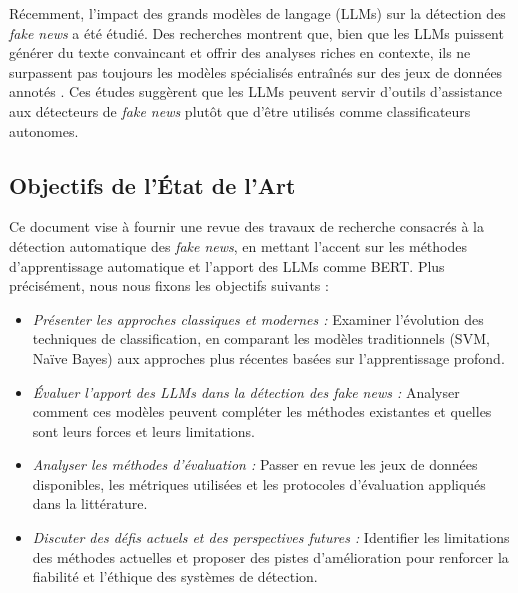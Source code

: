 \documentclass[a4paper,12pt, twocolumn]{article}
\begin{document}
\begin{twocolumn}
Récemment, l’impact des grands modèles de langage (LLMs) sur la détection des \textit{fake news} a été étudié. Des recherches montrent que, bien que les LLMs puissent générer du texte convaincant et offrir des analyses riches en contexte, ils ne surpassent pas toujours les modèles spécialisés entraînés sur des jeux de données annotés \cite{hu_bad_2024}. Ces études suggèrent que les LLMs peuvent servir d’outils d’assistance aux détecteurs de \textit{fake news} plutôt que d’être utilisés comme classificateurs autonomes.

\subsection{Objectifs de l’État de l’Art}
Ce document vise à fournir une revue des travaux de recherche consacrés à la détection automatique des \textit{fake news}, en mettant l’accent sur les méthodes d’apprentissage automatique et l’apport des LLMs comme BERT. Plus précisément, nous nous fixons les objectifs suivants :
\begin{itemize}
\item \textit{Présenter les approches classiques et modernes :} Examiner l’évolution des techniques de classification, en comparant les modèles traditionnels (SVM, Naïve Bayes) aux approches plus récentes basées sur l’apprentissage profond.
\item \textit{Évaluer l’apport des LLMs dans la détection des \textit{fake news} :} Analyser comment ces modèles peuvent compléter les méthodes existantes et quelles sont leurs forces et leurs limitations.
\item \textit{Analyser les méthodes d’évaluation :} Passer en revue les jeux de données disponibles, les métriques utilisées et les protocoles d’évaluation appliqués dans la littérature.
\item \textit{Discuter des défis actuels et des perspectives futures :} Identifier les limitations des méthodes actuelles et proposer des pistes d’amélioration pour renforcer la fiabilité et l’éthique des systèmes de détection.
\end{itemize}


\end{twocolumn}
\end{document}

